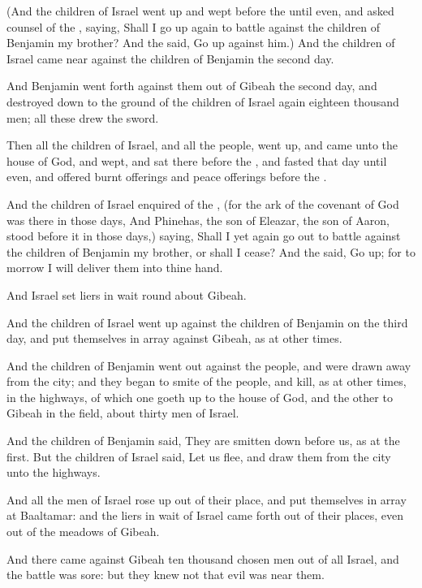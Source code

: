 \Verse (And the children of Israel went up and wept before the \LORD until even, and asked counsel of the \LORD, saying, Shall I go up again to battle against the children of Benjamin my brother? And the \LORD said, Go up against him.)  \Verse And the children of Israel came near against the children of Benjamin the second day.

\Verse And Benjamin went forth against them out of Gibeah the second day, and destroyed down to the ground of the children of Israel again eighteen thousand men; all these drew the sword.

\Verse Then all the children of Israel, and all the people, went up, and came unto the house of God, and wept, and sat there before the \LORD, and fasted that day until even, and offered burnt offerings and peace offerings before the \LORD.

\Verse And the children of Israel enquired of the \LORD, (for the ark of the covenant of God was there in those days, \Verse And Phinehas, the son of Eleazar, the son of Aaron, stood before it in those days,) saying, Shall I yet again go out to battle against the children of Benjamin my brother, or shall I cease? And the \LORD said, Go up; for to morrow I will deliver them into thine hand.

\Verse And Israel set liers in wait round about Gibeah.

\Verse And the children of Israel went up against the children of Benjamin on the third day, and put themselves in array against Gibeah, as at other times.

\Verse And the children of Benjamin went out against the people, and were drawn away from the city; and they began to smite of the people, and kill, as at other times, in the highways, of which one goeth up to the house of God, and the other to Gibeah in the field, about thirty men of Israel.

\Verse And the children of Benjamin said, They are smitten down before us, as at the first. But the children of Israel said, Let us flee, and draw them from the city unto the highways.

\Verse And all the men of Israel rose up out of their place, and put themselves in array at Baaltamar: and the liers in wait of Israel came forth out of their places, even out of the meadows of Gibeah.

\Verse And there came against Gibeah ten thousand chosen men out of all Israel, and the battle was sore: but they knew not that evil was near them.

